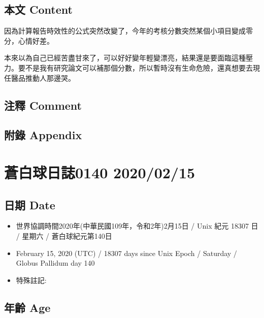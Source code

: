 \documentclass[
]{article}
\providecommand{\tightlist}{%
  \setlength{\itemsep}{0pt}\setlength{\parskip}{0pt}}
\begin{document}
\hypertarget{ux672cux6587-content-13}{%
\subsection{本文 Content}\label{ux672cux6587-content-13}}

因為計算報告時效性的公式突然改變了，今年的考核分數突然某個小項目變成零分，心情好差。

本來以為自己已經苦盡甘來了，可以好好變年輕變漂亮，結果還是要面臨這種壓力。要不是我有研究論文可以補那個分數，所以暫時沒有生命危險，還真想要去現任醫品推動人那邊哭。

\hypertarget{ux6ce8ux91cb-comment-13}{%
\subsection{注釋 Comment}\label{ux6ce8ux91cb-comment-13}}

\hypertarget{ux9644ux9304-appendix-13}{%
\subsection{附錄 Appendix}\label{ux9644ux9304-appendix-13}}

\hypertarget{ux84bcux767dux7403ux65e5ux8a8c0140-20200215}{%
\section{蒼白球日誌0140
2020/02/15}\label{ux84bcux767dux7403ux65e5ux8a8c0140-20200215}}

\hypertarget{ux65e5ux671f-date-14}{%
\subsection{日期 Date}\label{ux65e5ux671f-date-14}}

\begin{itemize}
\tightlist
\item
  世界協調時間2020年(中華民國109年，令和2年)2月15日 / Unix 紀元 18307 日
  / 星期六 / 蒼白球紀元第140日
\item
  February 15, 2020 (UTC) / 18307 days since Unix Epoch / Saturday /
  Globus Pallidum day 140
\item
  特殊註記:
\end{itemize}

\hypertarget{ux5e74ux9f61-age-14}{%
\subsection{年齡 Age}\label{ux5e74ux9f61-age-14}}
\end{document}
